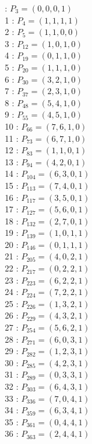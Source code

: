 \documentclass{article}
\begin{document}
{\begin{multicols}{3}
 : $P_{3}=( 0, 0, 0, 1 )$\\
1 : $P_{4}=( 1, 1, 1, 1 )$\\
2 : $P_{5}=( 1, 1, 0, 0 )$\\
3 : $P_{12}=( 1, 0, 1, 0 )$\\
4 : $P_{19}=( 0, 1, 1, 0 )$\\
5 : $P_{20}=( 1, 1, 1, 0 )$\\
6 : $P_{30}=( 3, 2, 1, 0 )$\\
7 : $P_{37}=( 2, 3, 1, 0 )$\\
8 : $P_{48}=( 5, 4, 1, 0 )$\\
9 : $P_{55}=( 4, 5, 1, 0 )$\\
10 : $P_{66}=( 7, 6, 1, 0 )$\\
11 : $P_{73}=( 6, 7, 1, 0 )$\\
12 : $P_{83}=( 1, 1, 0, 1 )$\\
13 : $P_{94}=( 4, 2, 0, 1 )$\\
14 : $P_{104}=( 6, 3, 0, 1 )$\\
15 : $P_{113}=( 7, 4, 0, 1 )$\\
16 : $P_{117}=( 3, 5, 0, 1 )$\\
17 : $P_{127}=( 5, 6, 0, 1 )$\\
18 : $P_{132}=( 2, 7, 0, 1 )$\\
19 : $P_{139}=( 1, 0, 1, 1 )$\\
20 : $P_{146}=( 0, 1, 1, 1 )$\\
21 : $P_{205}=( 4, 0, 2, 1 )$\\
22 : $P_{217}=( 0, 2, 2, 1 )$\\
23 : $P_{223}=( 6, 2, 2, 1 )$\\
24 : $P_{224}=( 7, 2, 2, 1 )$\\
25 : $P_{226}=( 1, 3, 2, 1 )$\\
26 : $P_{229}=( 4, 3, 2, 1 )$\\
27 : $P_{254}=( 5, 6, 2, 1 )$\\
28 : $P_{271}=( 6, 0, 3, 1 )$\\
29 : $P_{282}=( 1, 2, 3, 1 )$\\
30 : $P_{285}=( 4, 2, 3, 1 )$\\
31 : $P_{289}=( 0, 3, 3, 1 )$\\
32 : $P_{303}=( 6, 4, 3, 1 )$\\
33 : $P_{336}=( 7, 0, 4, 1 )$\\
34 : $P_{359}=( 6, 3, 4, 1 )$\\
35 : $P_{361}=( 0, 4, 4, 1 )$\\
36 : $P_{363}=( 2, 4, 4, 1 )$\\

\end{multicols}}
\end{document}
